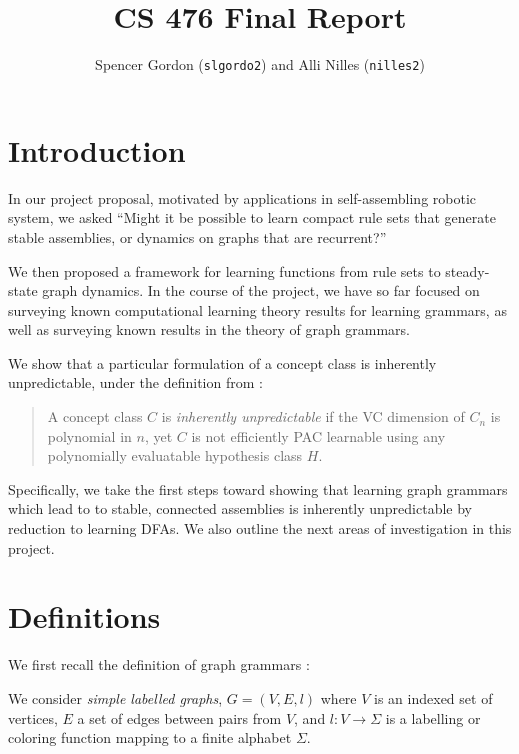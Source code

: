 \documentclass[]{article}
\title{CS 476 Final Report}
\author{Spencer Gordon (\texttt{slgordo2}) and Alli Nilles (\texttt{nilles2})}
\date{}
\begin{document}
\maketitle

\newcommand{\step}[1]{\xrightarrow{#1}}
\newcommand{\steps}[1]{\xRightarrow{#1}}

\section{Introduction}

In our project proposal, motivated by applications in self-assembling
robotic system, we asked ``Might it be possible to learn compact rule
sets that generate stable assemblies, or dynamics on graphs that are
recurrent?''

We then proposed a framework for learning functions from rule sets to
steady-state graph dynamics. In the course of the project, we have so
far focused on surveying known computational learning theory results for
learning grammars, as well as surveying known results in the theory of
graph grammars.

We show that a particular formulation of a concept class is inherently
unpredictable, under the definition from \cite{kearns1994}:

\begin{quote}
A concept class \(C\) is \emph{inherently unpredictable} if the VC
dimension of \(C_n\) is polynomial in \(n\), yet \(C\) is not
efficiently PAC learnable using any polynomially evaluatable hypothesis
class \(H\).
\end{quote}

Specifically, we take the first steps toward showing that learning graph
grammars which lead to to stable, connected assemblies is inherently
unpredictable by reduction to learning DFAs. We also outline the next areas of
investigation in this project.

\section{Definitions}\label{definitions}

We first recall the definition of graph grammars \cite{litovsky}
\cite{klavins}:

We consider \emph{simple labelled graphs}, \(G = (V,E,l)\) where \(V\)
is an indexed set of vertices, \(E\) a set of edges between pairs from
\(V\), and \(l: V \to \Sigma\) is a labelling or coloring function mapping to a
finite alphabet $\Sigma$.
\end{document}
